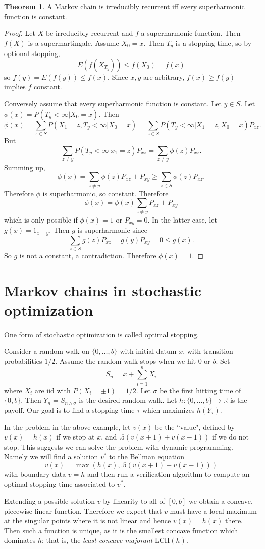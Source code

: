 \documentclass[12pt]{book}
\newcommand{\RR}{\mathbb{R}}
\newcommand{\dfn}[1]{\emph{#1}\index{#1}}
\theoremstyle{definition}
\newtheorem{theorem}{Theorem}[chapter]
\newenvironment{example}
  {\pushQED{\qed}\renewcommand{\qedsymbol}{$\diamondsuit$}\examplex}
  {\popQED\endexamplex}
\begin{document}
\begin{theorem}
A Markov chain is irreducibly recurrent iff every superharmonic function is constant.
\end{theorem}
\begin{proof}
Let $X$ be irreducibly recurrent and $f$ a superharmonic function.
Then $f(X)$ is a supermartingale.
Assume $X_0 = x$. Then $T_y$ is a stopping time, so by optional stopping,
$$E(f(X_{T_y})) \leq f(X_0) = f(x)$$
so $f(y) = E(f(y)) \leq f(x)$.
Since $x,y$ are arbitrary, $f(x) \geq f(y)$ implies $f$ constant.

Conversely assume that every superharmonic function is constant.
Let $y \in S$. Let $\phi(x) = P(T_y < \infty|X_0 = x)$.
Then
$$\phi(x) = \sum_{z \in S} P(X_1 = z, T_y < \infty|X_0 = x) = \sum_{z \in S} P(T_y < \infty|X_1 = z, X_0 = x)P_{xz}.$$
But
$$\sum_{z \neq y} P(T_y < \infty|x_1 = z)P_{xz} = \sum_{z \neq y} \phi(z)P_{xz}.$$
Summing up,
$$\phi(x) = \sum_{z \neq y}\phi(z) P_{xz} + P_{xy} \geq \sum_{z \in S} \phi(z)P_{xz}.$$
Therefore $\phi$ is superharmonic, so constant.
Therefore
$$\phi(x) = \phi(x) \sum_{z \neq y} P_{xz} + P_{xy}$$
which is only possible if $\phi(x) = 1$ or $P_{xy} = 0$.
In the latter case, let $g(x) = 1_{x = y}$.
Then $g$ is superharmonic since
$$\sum_{z \in S} g(z) P_{xz} = g(y) P_{xy} = 0 \leq g(x).$$
So $g$ is not a constant, a contradiction.
Therefore $\phi(x) = 1$.
\end{proof}

\section{Markov chains in stochastic optimization}
One form of stochastic optimization is called optimal stopping.

\begin{example}
Consider a random walk on $\{0, \dots, b\}$ with initial datum $x$, with transition probabilities $1/2$.
Assume the random walk stops when we hit $0$ or $b$.
Set
$$S_n = x + \sum_{i=1}^n X_i$$
where $X_i$ are iid with $P(X_i = \pm 1) = 1/2$. Let $\sigma$ be the first hitting time of $\{0, b\}$.
Then $Y_n = S_{n \wedge \sigma}$ is the desired random walk.
Let $h: \{0, \dots, b\} \to \RR$ is the payoff.
Our goal is to find a stopping time $\tau$ which maximizes $h(Y_\tau)$.

In the problem in the above example, let $v(x)$ be the ``value", defined by $v(x) = h(x)$ if we stop at $x$, and $.5(v(x+1) + v(x-1))$ if we do not stop.
This suggests we can solve the problem with dynamic programming.
Namely we will find a solution $v^*$ to the Bellman equation
$$v(x) = \max(h(x), .5(v(x+1) + v(x-1)))$$
with boundary data $v = h$
and then run a verification algorithm to compute an optimal stopping time associated to $v^*$.

Extending a possible solution $v$ by linearity to all of $[0, b]$ we obtain a concave, piecewise linear function.
Therefore we expect that $v$ must have a local maximum at the singular points where it is not linear and hence $v(x) = h(x)$ there.
Then such a function is unique, as it is the smallest concave function which dominates $h$; that is, the \dfn{least concave majorant} LCH$(h)$.
\end{example}
\end{document}

